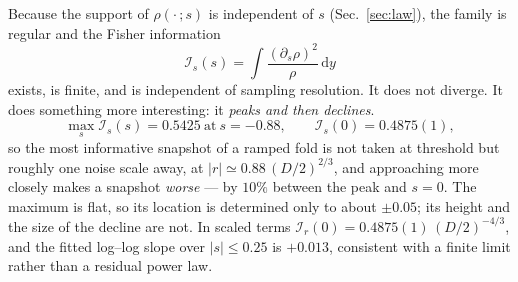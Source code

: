 \documentclass[%
 twocolumn,
 superscriptaddress,
 amsmath,amssymb,
 aps,
 pre,
 floatfix,
]{revtex4-2}
\newcommand{\dd}{\mathrm{d}}
\newcommand{\Ifish}{\mathcal{I}}
\begin{document}
Because the support of $\rho(\cdot\,;s)$ is independent of $s$ (Sec.~\ref{sec:law}), the family is regular and the Fisher information
\begin{equation}
\label{eq:Idef}
\Ifish_s(s)=\int\frac{(\partial_s\rho)^2}{\rho}\,\dd y
\end{equation}
exists, is finite, and is independent of sampling resolution.  It does not diverge.  It does something more interesting: it \emph{peaks and then declines}.
\begin{equation}
\label{eq:plateau}
\max_s\Ifish_s(s)=0.5425\ \text{at}\ s=-0.88,
\qquad
\Ifish_s(0)=0.4875(1),
\end{equation}
so the most informative snapshot of a ramped fold is not taken at threshold but roughly one noise scale away, at $|r|\simeq0.88\,(D/2)^{2/3}$, and approaching more closely makes a snapshot \emph{worse} --- by $10\%$ between the peak and $s=0$.  The maximum is flat, so its location is determined only to about $\pm0.05$; its height and the size of the decline are not.  In scaled terms $\Ifish_r(0)=0.4875(1)\,(D/2)^{-4/3}$, and the fitted log--log slope over $|s|\le0.25$ is $+0.013$, consistent with a finite limit rather than a residual power law.
\end{document}
